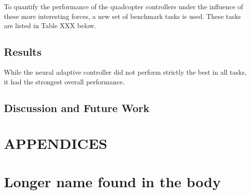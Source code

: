\documentclass[letterpaper,12pt,titlepage,oneside,final]{book}
\let\origdoublepage\cleardoublepage
\newcommand{\clearemptydoublepage}{%
  \clearpage{\pagestyle{empty}\origdoublepage}}
\let\cleardoublepage\clearemptydoublepage
\begin{document}
To quantify the performance of the quadcopter controllers under the influence of these more interesting forces, a new set of benchmark tasks is used.
These tasks are listed in Table XXX below.


\section{Results}


While the neural adaptive controller did not perform strictly the best in all tasks, it had the strongest overall performance. 

\section{Discussion and Future Work}



\appendix

\chapter*{APPENDICES}
\chapter[Name in Contents]{Longer name found in the body}
\label{AppendixA}




\cleardoublepage %
\renewcommand*{\bibname}{References}
\end{document}
